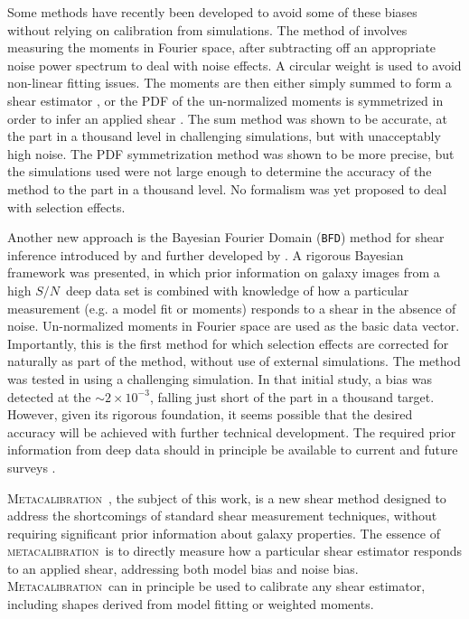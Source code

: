 \documentclass[iop]{emulateapj}
\newcommand{\snr}{$S/N$}
\newcommand{\mcal}{\textsc{metacalibration}}
\newcommand{\Mcal}{\textsc{Metacalibration}}
\newcommand{\bfd}{\texttt{BFD}}
\begin{document}
Some methods have recently been developed to avoid some of these biases without
relying on calibration from simulations.  The method of \citep{Zhang2017}
involves measuring the moments in Fourier space, after subtracting off an
appropriate noise power spectrum to deal with noise effects.  A circular weight
is used to avoid non-linear fitting issues.  The moments are then either simply
summed to form a shear estimator \citep{Zhang2015}, or the PDF of the
un-normalized moments is symmetrized in order to infer an applied shear
\citep{Zhang2017}.  The sum method was shown to be accurate, at the part in a
thousand level in challenging simulations, but with unacceptably high noise.
The PDF symmetrization method was shown to be more precise, but the simulations
used were not large enough to determine the accuracy of the method to the part
in a thousand level.  No formalism was yet proposed to deal with selection
effects. 

Another new approach is the Bayesian Fourier Domain (\bfd) method for shear
inference introduced by \cite{ba14} and further developed by \cite{bfd2016}.  A
rigorous Bayesian framework was presented, in which prior information on galaxy
images from a high \snr\ deep data set is combined with knowledge of how a
particular measurement (e.g. a model fit or moments) responds to a shear in the
absence of noise.  Un-normalized moments in Fourier space are used as the basic
data vector.  Importantly, this is the first method for which selection effects
are corrected for naturally as part of the method, without use of external
simulations.  The method was tested in \cite{bfd2016} using a challenging
simulation.  In that initial study, a bias was detected at the $\sim 2 \times
10^{-3}$, falling just short of the part in a thousand target.  However, given
its rigorous foundation, it seems possible that the desired accuracy will be
achieved with further technical development.  The required prior information
from deep data should in principle be available to current and future surveys
\citep{DESWhitePaper,TakadaHSC2010,IvezicLSST08,Euclid2011,SpergelWFIRST2015}.



\Mcal\ \citep{HuffMcal}, the subject of this work, is a new shear
method designed to address the shortcomings of standard shear measurement
techniques, without requiring significant prior information about galaxy
properties.  The essence of \mcal\ is to directly measure how a particular
shear estimator responds to an applied shear, addressing both model bias and
noise bias.  \Mcal\ can in principle be used to calibrate any shear
estimator, including shapes derived from model fitting or weighted moments.
\end{document}
